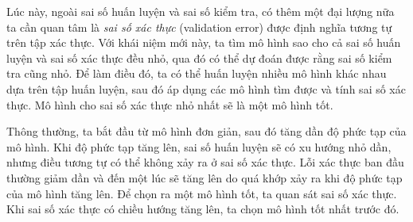 Lúc này, ngoài sai số huấn luyện và sai số kiểm tra, có thêm một đại lượng nữa ta cần
quan tâm là \textit{sai số xác thực} (validation error) được định nghĩa tương tự trên tập xác thực.
Với khái niệm mới này, ta tìm mô hình sao cho cả {sai số huấn luyện} và {sai số xác thực}
đều nhỏ, qua đó có thể dự đoán được rằng {sai số kiểm tra} cũng nhỏ. Để làm điều
đó, ta có thể huấn luyện nhiều mô hình khác nhau dựa trên tập huấn luyện, sau đó
áp dụng các mô hình tìm được và tính {sai số xác thực}. Mô hình cho {sai số xác thực}
nhỏ nhất sẽ là một mô hình tốt.
 
Thông thường, ta bắt đầu từ mô hình đơn giản, sau đó tăng dần độ phức tạp của mô
hình. Khi độ phức tạp tăng lên, sai số huấn luyện sẽ có xu hướng nhỏ dần, nhưng
điều tương tự có thể không xảy ra ở sai số xác thực. Lỗi xác thực ban đầu
thường giảm dần và đến một lúc sẽ tăng lên do quá khớp xảy ra khi độ phức tạp của mô hình tăng lên. Để chọn ra một mô hình tốt, ta quan
sát sai số xác thực. Khi {sai số xác thực} có chiều hướng tăng lên, ta chọn mô hình tốt nhất trước đó.
 

 

